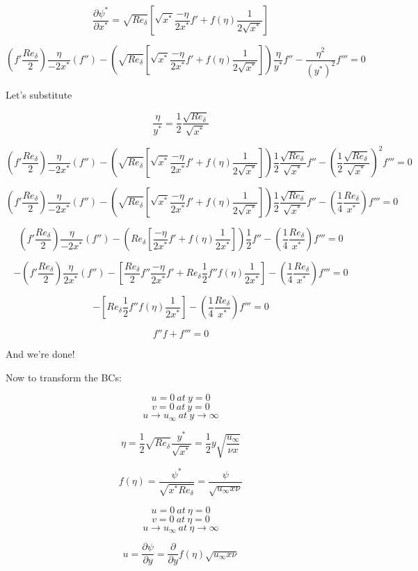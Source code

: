 \documentclass[11pt]{article}
\begin{document}
$$\frac{\partial \psi^*}{\partial x^*} = \sqrt{Re_\delta}[ \sqrt{x^*} \frac{-\eta}{2 x^*} f'  + f(\eta) \frac{1}{2\sqrt{x^*}} ]$$


$$  (f' \frac{Re_\delta}{2}) \frac{\eta}{-2x^*} (f'' ) - (\sqrt{Re_\delta}[ \sqrt{x^*} \frac{-\eta}{2 x^*} f'  + f(\eta) \frac{1}{2\sqrt{x^*}}])  \frac{\eta}{y^*}f'' - \frac{\eta^2}{(y^*)^2}f'''  =  0$$

Let's substitute

$$\frac{\eta}{y^*} = \frac{1}{2} \frac{\sqrt{Re_\delta}}{\sqrt{x^*}}$$


$$  (f' \frac{Re_\delta}{2}) \frac{\eta}{-2x^*} (f'' ) - (\sqrt{Re_\delta}[ \sqrt{x^*} \frac{-\eta}{2 x^*} f'  + f(\eta) \frac{1}{2\sqrt{x^*}}])  \frac{1}{2} \frac{\sqrt{Re_\delta}}{\sqrt{x^*}}f'' - (\frac{1}{2} \frac{\sqrt{Re_\delta}}{\sqrt{x^*}})^2f'''  =  0$$

$$  (f' \frac{Re_\delta}{2}) \frac{\eta}{-2x^*} (f'' ) - (\sqrt{Re_\delta}[ \sqrt{x^*} \frac{-\eta}{2 x^*} f'  + f(\eta) \frac{1}{2\sqrt{x^*}}])  \frac{1}{2} \frac{\sqrt{Re_\delta}}{\sqrt{x^*}}f'' - (\frac{1}{4} \frac{Re_\delta}{x^*})f'''  =  0$$

$$  (f' \frac{Re_\delta}{2}) \frac{\eta}{-2x^*} (f'' ) - (Re_\delta[  \frac{-\eta}{2 x^*} f'  + f(\eta) \frac{1}{2x^*}])  \frac{1}{2} f'' - (\frac{1}{4} \frac{Re_\delta}{x^*})f'''  =  0$$

$$  -(f' \frac{Re_\delta}{2}) \frac{\eta}{2x^*} (f'' ) - [ \frac{Re_\delta}{2} f'' \frac{-\eta}{2 x^*} f'  + Re_\delta\frac{1}{2} f''f(\eta) \frac{1}{2x^*}]   - (\frac{1}{4} \frac{Re_\delta}{x^*})f'''  =  0$$


$$ - [ Re_\delta\frac{1}{2} f''f(\eta) \frac{1}{2x^*}]   - (\frac{1}{4} \frac{Re_\delta}{x^*})f'''  =  0$$

$$f''f+f'''=0$$

And we're done!

Now to transform the BCs:

$$u=0\ at\ y=0$$
$$v=0\ at\ y=0$$
$$u \rightarrow u_\infty \ at \ y\rightarrow \infty$$

$$\eta = \frac{1}{2} \sqrt{Re_\delta} \frac{y^*}{\sqrt{x^*}} = \frac{1}{2}y \sqrt{\frac{u_\infty}{\nu x}} $$

$$f(\eta) = \frac{\psi^*}{\sqrt{x^* Re_\delta}} = \frac{\psi}{\sqrt{u_\infty x \nu}}$$

$$u=0\ at\ \eta=0$$
$$v=0\ at\ \eta=0$$
$$u \rightarrow u_\infty \ at \ \eta \rightarrow \infty$$

$$u=\frac{\partial \psi}{\partial y}= \frac{\partial}{\partial y} f(\eta) \sqrt{u_\infty x \nu}$$
\end{document}
